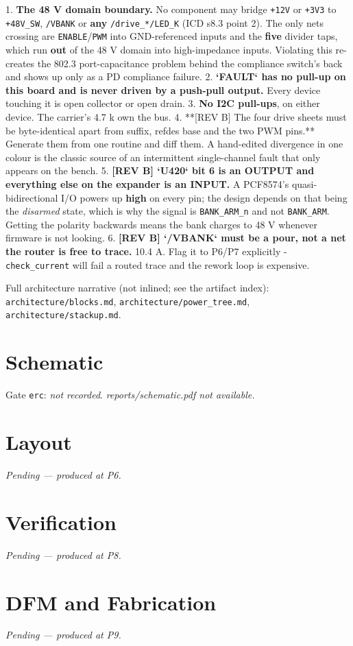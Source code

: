 \documentclass[11pt,a4paper]{article}
\begin{document}
1. \textbf{The 48 V domain boundary.} No component may bridge \texttt{+12V} or \texttt{+3V3} to \texttt{+48V\_SW}, \texttt{/VBANK} or \textbf{any} \texttt{/drive\_{*}/LED\_K} (ICD s8.3 point 2). The only nets crossing are \texttt{ENABLE}/\texttt{PWM} into GND-referenced inputs and the \textbf{five} divider taps, which run \textbf{out} of the 48 V domain into high-impedance inputs. Violating this re-creates the 802.3 port-capacitance problem behind the compliance switch's back and shows up only as a PD compliance failure. 2. \textbf{`FAULT` has no pull-up on this board and is never driven by a push-pull output.} Every device touching it is open collector or open drain. 3. \textbf{No I2C pull-ups}, on either device. The carrier's 4.7 k own the bus. 4. {*}{*}{[}REV B{]} The four drive sheets must be byte-identical apart from suffix, refdes base and the two PWM pins.{*}{*} Generate them from one routine and diff them. A hand-edited divergence in one colour is the classic source of an intermittent single-channel fault that only appears on the bench. 5. \textbf{{[}REV B{]} `U420` bit 6 is an OUTPUT and everything else on the expander is an INPUT.} A PCF8574's quasi-bidirectional I/O powers up \textbf{high} on every pin; the design depends on that being the \emph{disarmed} state, which is why the signal is \texttt{BANK\_ARM\_n} and not \texttt{BANK\_ARM}. Getting the polarity backwards means the bank charges to 48 V whenever firmware is not looking. 6. \textbf{{[}REV B{]} `/VBANK` must be a pour, not a net the router is free to trace.} 10.4 A. Flag it to P6/P7 explicitly - \texttt{check\_current} will fail a routed trace and the rework loop is expensive.

Full architecture narrative (not inlined; see the artifact index): \texttt{architecture/blocks.md}, \texttt{architecture/power\_tree.md}, \texttt{architecture/stackup.md}.
\section{Schematic}
Gate \texttt{erc}: \emph{not recorded}.
\emph{reports/schematic.pdf not available.}
\section{Layout}
\emph{Pending --- produced at P6.}
\section{Verification}
\emph{Pending --- produced at P8.}
\section{DFM and Fabrication}
\emph{Pending --- produced at P9.}
\end{document}
